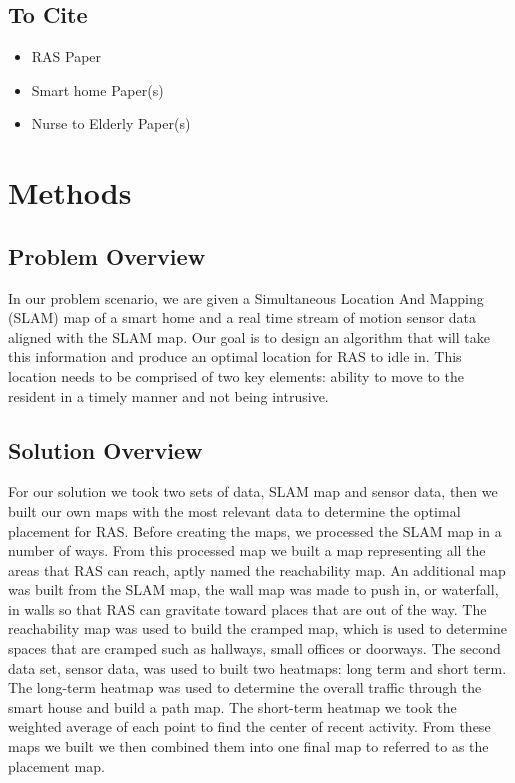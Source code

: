 \documentclass[11pt, draft, a4paper]{IEEEtran}
\begin{document}
\subsection{To Cite}
\begin{itemize}
    \item RAS Paper
    \item Smart home Paper(s)
    \item Nurse to Elderly Paper(s)
\end{itemize}


\section{Methods}


\subsection{Problem Overview}
In our problem scenario, we are given a Simultaneous Location And Mapping (SLAM) map of a smart home and a real time stream of motion sensor data aligned with the SLAM map. Our goal is to design an algorithm that will take this information and produce an optimal location for RAS to idle in. This location needs to be comprised of two key elements: ability to move to the resident in a timely manner and not being intrusive. 


\subsection{Solution Overview}
For our solution we took two sets of data, SLAM map and sensor data, then we built our own maps with the most relevant data to determine the optimal placement for RAS. Before creating the maps, we processed the SLAM map in a number of ways. From this processed map we built a map representing all the areas that RAS can reach, aptly named the reachability map. An additional map was built from the SLAM map, the wall map was made to push in, or waterfall, in walls so that RAS can gravitate toward places that are out of the way. The reachability map was used to build the cramped map, which is used to determine spaces that are cramped such as hallways, small offices or doorways.
The second data set, sensor data, was used to built two heatmaps: long term and short term. The long-term heatmap was used to determine the overall traffic through the smart house and build a path map. The short-term heatmap we took the weighted average of each point to find the center of recent activity.
From these maps we built we then combined them into one final map to referred to as the placement map. 
\end{document}
